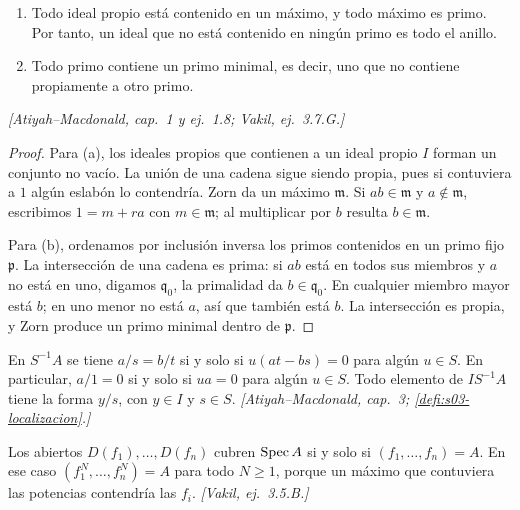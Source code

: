 \begin{prop}
\label{prop:s09-maximos-minimales}
\begin{enumerate}[label=(\alph*)]
\item Todo ideal propio está contenido en un máximo, y todo máximo es primo. Por tanto, un ideal que no está contenido en ningún primo es todo el anillo.
\item Todo primo contiene un primo minimal, es decir, uno que no contiene propiamente a otro primo.
\end{enumerate}
\emph{[Atiyah--Macdonald, cap.~1 y ej.~1.8; Vakil, ej.~3.7.G.]}
\end{prop}
\begin{proof}
Para (a), los ideales propios que contienen a un ideal propio $I$ forman un conjunto no vacío. La unión de una cadena sigue siendo propia, pues si contuviera a $1$ algún eslabón lo contendría. Zorn da un máximo $\mathfrak m$. Si $ab\in\mathfrak m$ y $a\notin\mathfrak m$, escribimos $1=m+ra$ con $m\in\mathfrak m$; al multiplicar por $b$ resulta $b\in\mathfrak m$.

Para (b), ordenamos por inclusión inversa los primos contenidos en un primo fijo $\mathfrak p$. La intersección de una cadena es prima: si $ab$ está en todos sus miembros y $a$ no está en uno, digamos $\mathfrak q_0$, la primalidad da $b\in\mathfrak q_0$. En cualquier miembro mayor está $b$; en uno menor no está $a$, así que también está $b$. La intersección es propia, y Zorn produce un primo minimal dentro de $\mathfrak p$.
\end{proof}

\begin{prop}[Localización]
\label{prop:s09-localizacion}
En $S^{-1}A$ se tiene $a/s=b/t$ si y solo si $u(at-bs)=0$ para algún $u\in S$. En particular, $a/1=0$ si y solo si $ua=0$ para algún $u\in S$. Todo elemento de $IS^{-1}A$ tiene la forma $y/s$, con $y\in I$ y $s\in S$. \emph{[Atiyah--Macdonald, cap.~3; \cref{defi:s03-localizacion}.]}
\end{prop}

\begin{prop}
\label{prop:s09-cubrimientos-basicos}
Los abiertos $D(f_1),\ldots,D(f_n)$ cubren $\operatorname{Spec} A$ si y solo si $(f_1,\ldots,f_n)=A$. En ese caso $(f_1^N,\ldots,f_n^N)=A$ para todo $N\ge1$, porque un máximo que contuviera las potencias contendría las $f_i$. \emph{[Vakil, ej.~3.5.B.]}
\end{prop}


